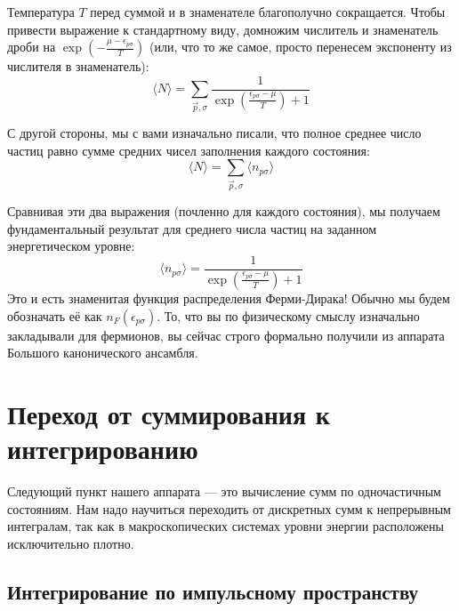 \documentclass[../general/general]{subfiles}
\begin{document}
Температура $T$ перед суммой и в знаменателе благополучно сокращается. Чтобы привести выражение к стандартному виду, домножим числитель и знаменатель дроби на $\exp\left(-\frac{\mu - \epsilon_{p\sigma}}{T}\right)$ (или, что то же самое, просто перенесем экспоненту из числителя в знаменатель):
\begin{equation}
    \langle N \rangle = \sum_{\vec{p}, \sigma} \frac{1}{\exp\left( \frac{\epsilon_{p\sigma} - \mu}{T} \right) + 1}
\end{equation}

С другой стороны, мы с вами изначально писали, что полное среднее число частиц равно сумме средних чисел заполнения каждого состояния:
\begin{equation}
    \langle N \rangle = \sum_{\vec{p}, \sigma} \langle n_{p\sigma} \rangle
\end{equation}

Сравнивая эти два выражения (почленно для каждого состояния), мы получаем фундаментальный результат для среднего числа частиц на заданном энергетическом уровне:
\begin{equation}
    \langle n_{p\sigma} \rangle = \frac{1}{\exp\left( \frac{\epsilon_{p\sigma} - \mu}{T} \right) + 1}
\end{equation}
Это и есть знаменитая функция распределения Ферми-Дирака! Обычно мы будем обозначать её как $n_F(\epsilon_{p\sigma})$. То, что вы по физическому смыслу изначально закладывали для фермионов, вы сейчас строго формально получили из аппарата Большого канонического ансамбля.







\section{Переход от суммирования к интегрированию}

Следующий пункт нашего аппарата — это вычисление сумм по одночастичным состояниям. Нам надо научиться переходить от дискретных сумм к непрерывным интегралам, так как в макроскопических системах уровни энергии расположены исключительно плотно.

\subsection{Интегрирование по импульсному пространству}
\end{document}

